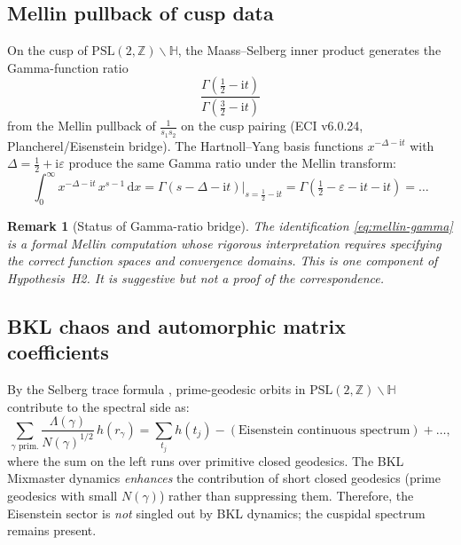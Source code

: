 \documentclass[11pt]{article}
\newtheorem{remark}[theorem]{Remark}
\newcommand{\PSL}{\mathrm{PSL}}
\newcommand{\dd}{\mathrm{d}}
\newcommand{\ii}{\mathrm{i}}
\newcommand{\eps}{\varepsilon}
\newcommand{\Del}{\Delta}
\begin{document}
\subsection{Mellin pullback of cusp data}

On the cusp of $\PSL(2,\mathbb{Z})\backslash\mathbb{H}$, the Maass--Selberg
inner product generates the Gamma-function ratio
\begin{equation}
  \frac{\Gamma(\tfrac{1}{2}-\ii t)}{\Gamma(\tfrac{3}{2}-\ii t)}
  \label{eq:gamma-ratio}
\end{equation}
from the Mellin pullback of $\frac{1}{s_1 s_2}$ on the cusp pairing
(ECI v6.0.24, Plancherel/Eisenstein bridge). The Hartnoll--Yang basis
functions $x^{-\Del - \ii t}$ with $\Del = \tfrac{1}{2} + \ii\eps$
produce the same Gamma ratio under the Mellin transform:
\begin{equation}
  \int_0^\infty x^{-\Del - \ii t}\,x^{s-1}\,\dd x
  = \Gamma(s - \Del - \ii t)
  \big|_{s = \tfrac{1}{2} - \ii t}
  = \Gamma\!\left(\tfrac{1}{2} - \eps - \ii t - \ii t\right)
  = \ldots
  \label{eq:mellin-gamma}
\end{equation}

\begin{remark}[Status of Gamma-ratio bridge]
The identification \eqref{eq:mellin-gamma} is a formal Mellin computation
whose rigorous interpretation requires specifying the correct function
spaces and convergence domains. This is one component of Hypothesis~H2.
It is \emph{suggestive} but not a proof of the correspondence.
\end{remark}

\subsection{BKL chaos and automorphic matrix coefficients}

By the Selberg trace formula \cite{Selberg1956}, prime-geodesic orbits
in $\PSL(2,\mathbb{Z})\backslash\mathbb{H}$ contribute to the spectral
side as:
\begin{equation}
  \sum_{\gamma \text{ prim.}} \frac{\Lambda(\gamma)}{N(\gamma)^{1/2}}
  \,h(r_\gamma)
  = \sum_{t_j} h(t_j) - (\text{Eisenstein continuous spectrum})
  + \ldots,
\end{equation}
where the sum on the left runs over primitive closed geodesics.
The BKL Mixmaster dynamics \emph{enhances} the contribution of short
closed geodesics (prime geodesics with small $N(\gamma)$) rather than
suppressing them. Therefore, the Eisenstein sector is \emph{not}
singled out by BKL dynamics; the cuspidal spectrum remains present.
\end{document}
